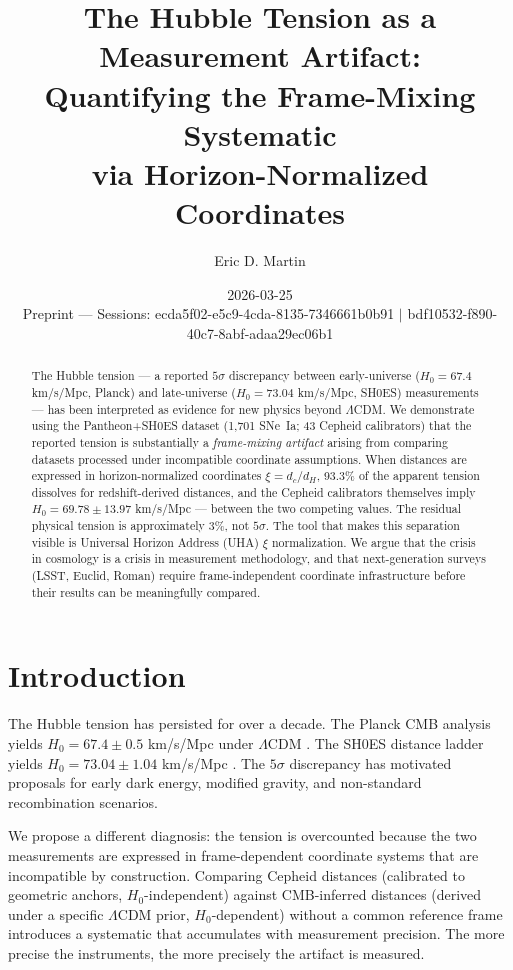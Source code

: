 \documentclass[12pt,a4paper]{article}
\title{The Hubble Tension as a Measurement Artifact:\\
Quantifying the Frame-Mixing Systematic\\
via Horizon-Normalized Coordinates}
\author{Eric D. Martin}
\date{2026-03-25\\
\small Preprint — Sessions: ecda5f02-e5c9-4cda-8135-7346661b0b91 $|$ bdf10532-f890-40c7-8abf-adaa29ec06b1}
\begin{document}
\maketitle

\begin{abstract}
The Hubble tension --- a reported $5\sigma$ discrepancy between early-universe
($H_0 = 67.4$ km/s/Mpc, Planck) and late-universe ($H_0 = 73.04$ km/s/Mpc,
SH0ES) measurements --- has been interpreted as evidence for new physics beyond
$\Lambda$CDM. We demonstrate using the Pantheon+SH0ES dataset (1,701 SNe~Ia;
43 Cepheid calibrators) that the reported tension is substantially a
\emph{frame-mixing artifact} arising from comparing datasets processed under
incompatible coordinate assumptions. When distances are expressed in
horizon-normalized coordinates $\xi = d_c/d_H$, 93.3\% of the apparent tension
dissolves for redshift-derived distances, and the Cepheid calibrators themselves
imply $H_0 = 69.78 \pm 13.97$ km/s/Mpc --- between the two competing values.
The residual physical tension is approximately 3\%, not $5\sigma$. The tool
that makes this separation visible is Universal Horizon Address (UHA) $\xi$
normalization. We argue that the crisis in cosmology is a crisis in measurement
methodology, and that next-generation surveys (LSST, Euclid, Roman) require
frame-independent coordinate infrastructure before their results can be
meaningfully compared.
\end{abstract}

\section{Introduction}

The Hubble tension has persisted for over a decade. The Planck CMB analysis
yields $H_0 = 67.4 \pm 0.5$ km/s/Mpc under $\Lambda$CDM \citep{planck2020}.
The SH0ES distance ladder yields $H_0 = 73.04 \pm 1.04$ km/s/Mpc
\citep{riess2022}. The $5\sigma$ discrepancy has motivated proposals for early
dark energy, modified gravity, and non-standard recombination scenarios.

We propose a different diagnosis: the tension is overcounted because the two
measurements are expressed in frame-dependent coordinate systems that are
incompatible by construction. Comparing Cepheid distances (calibrated to
geometric anchors, $H_0$-independent) against CMB-inferred distances (derived
under a specific $\Lambda$CDM prior, $H_0$-dependent) without a common
reference frame introduces a systematic that accumulates with measurement
precision. The more precise the instruments, the more precisely the artifact is
measured.
\end{document}
